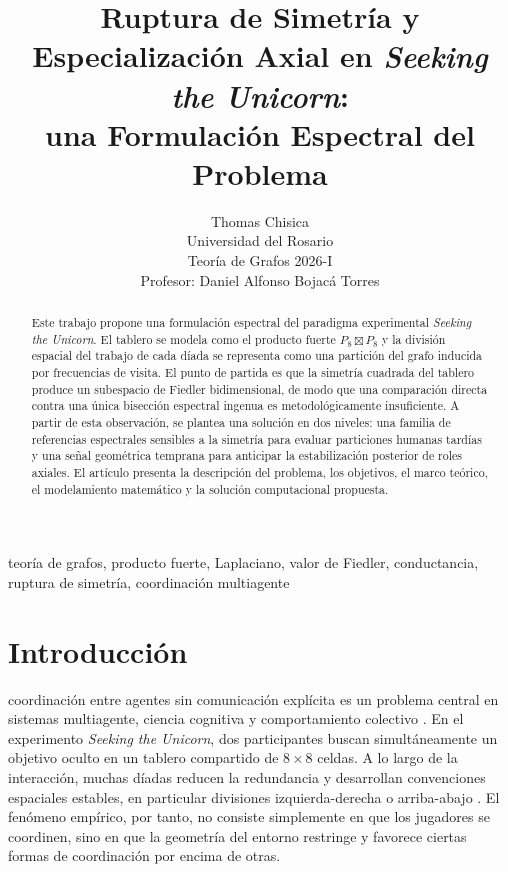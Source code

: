 \documentclass[journal]{IEEEtran}
\begin{document}
\title{Ruptura de Simetría y Especialización Axial en \emph{Seeking the Unicorn}:\\ una Formulación Espectral del Problema}

\author{Thomas Chisica\\
Universidad del Rosario\\
Teoría de Grafos 2026-I\\
Profesor: Daniel Alfonso Bojacá Torres}

\maketitle

\begin{abstract}
Este trabajo propone una formulación espectral del paradigma experimental \emph{Seeking the Unicorn}. El tablero se modela como el producto fuerte $P_8 \boxtimes P_8$ y la división espacial del trabajo de cada díada se representa como una partición del grafo inducida por frecuencias de visita. El punto de partida es que la simetría cuadrada del tablero produce un subespacio de Fiedler bidimensional, de modo que una comparación directa contra una única bisección espectral ingenua es metodológicamente insuficiente. A partir de esta observación, se plantea una solución en dos niveles: una familia de referencias espectrales sensibles a la simetría para evaluar particiones humanas tardías y una señal geométrica temprana para anticipar la estabilización posterior de roles axiales. El artículo presenta la descripción del problema, los objetivos, el marco teórico, el modelamiento matemático y la solución computacional propuesta.
\end{abstract}

\begin{IEEEkeywords}
teoría de grafos, producto fuerte, Laplaciano, valor de Fiedler, conductancia, ruptura de simetría, coordinación multiagente
\end{IEEEkeywords}

\section{Introducción}

 coordinación entre agentes sin comunicación explícita es un problema central en sistemas multiagente, ciencia cognitiva y comportamiento colectivo \cite{mesbahi2010,andrade2021,goldstone2024}. En el experimento \emph{Seeking the Unicorn}, dos participantes buscan simultáneamente un objetivo oculto en un tablero compartido de $8\times8$ celdas. A lo largo de la interacción, muchas díadas reducen la redundancia y desarrollan convenciones espaciales estables, en particular divisiones izquierda-derecha o arriba-abajo \cite{andrade2021}. El fenómeno empírico, por tanto, no consiste simplemente en que los jugadores se coordinen, sino en que la geometría del entorno restringe y favorece ciertas formas de coordinación por encima de otras.
\end{document}

